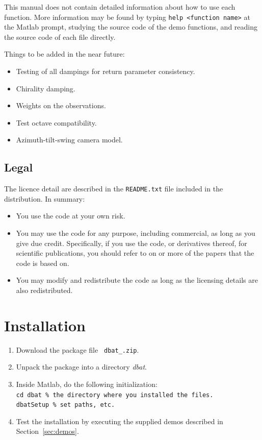 \documentclass{article}
\begin{document}
This manual does not contain detailed information about how to use
each function. More information may be found by typing \texttt{help
  <function name>} at the Matlab prompt, studying the source code of
the demo functions, and reading the source code of each file directly.

Things to be added in the near future:
\begin{itemize}
\item Testing of all dampings for return parameter consistency.
\item Chirality damping.
\item Weights on the observations.
\item Test octave compatibility.
\item Azimuth-tilt-swing camera model.
\end{itemize}

\subsection{Legal}

The licence detail are described in the \texttt{README.txt} file
included in the distribution. In summary:
\begin{itemize}
\item You use the code at your own risk.
\item You may use the code for any purpose, including commercial, as
  long as you give due credit. Specifically, if you use the code, or
  derivatives thereof, for scientific publications, you should refer
  to on or more of the papers
  \citet{Borlin2013:Bundle,Borlin2013:Experiments} that the code is
  based on.
\item You may modify and redistribute the code as long as the
  licensing details are also redistributed.
\end{itemize}

\section{Installation}
\label{sec:install}

\begin{enumerate}
\item Download the package file {\tt
  \verb+dbat_+\dbatversion\verb+.zip+}.
\item Unpack the package into a directory \emph{dbat}.
\item \label{step:dbatInit}
Inside Matlab, do the following initialization:\\
\verb+cd dbat % the directory where you installed the files.+\\
\verb+dbatSetup % set paths, etc.+
\item Test the installation by executing the supplied demos described
  in Section~\ref{sec:demos}.
\end{enumerate}
\end{document}

